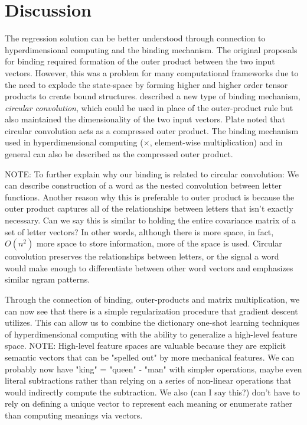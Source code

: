 \documentclass{article}
\begin{document}
\section{Discussion}
The regression solution can be better understood through connection to hyperdimensional computing and the binding mechanism. The original proposals for binding \citet{Smolensky1990} required formation of the outer product between the two input vectors. However, this was a problem for many computational frameworks due to the need to explode the state-space by forming higher and higher order tensor products to create bound structures. \citet{Plate1991} described a new type of binding mechanism, \emph{circular convolution}, which could be used in place of the outer-product rule but also maintained the dimensionality of the two input vectors. Plate noted that circular convolution acts as a compressed outer product. The binding mechanism used in hyperdimensional computing ($\times$, element-wise multiplication) and in general can also be described as the compressed outer product. 

NOTE: To further explain why our binding is related to circular convolution: We can describe construction of a word as the nested convolution between letter functions. Another reason why this is preferable to outer product is because the outer product captures all of the relationships between letters that isn't exactly necessary. Can we say this is similar to holding the entire covariance matrix of a set of letter vectors? In other words, although there is more space, in fact, $O(n^2)$ more space to store information, more of the space is used. Circular convolution preserves the relationships between letters, or the signal a word would make enough to differentiate between other word vectors and emphasizes similar ngram patterns.


Through the connection of binding, outer-products and matrix multiplication, we can now see that there is a simple regularization procedure that gradient descent utilizes. This can allow us to combine the dictionary one-shot learning techniques of hyperdimensional computing with the ability to generalize a high-level feature space.
NOTE: High-level feature spaces are valuable because they are explicit semantic vectors that can be "spelled out" by more mechanical features. We can probably now have "king" = "queen" - "man" with simpler operations, maybe even literal subtractions rather than relying on a series of non-linear operations that would indirectly compute the subtraction. We also (can I say this?) don't have to rely on defining a unique vector to represent each meaning or enumerate rather than computing meanings via vectors. 
\end{document}

